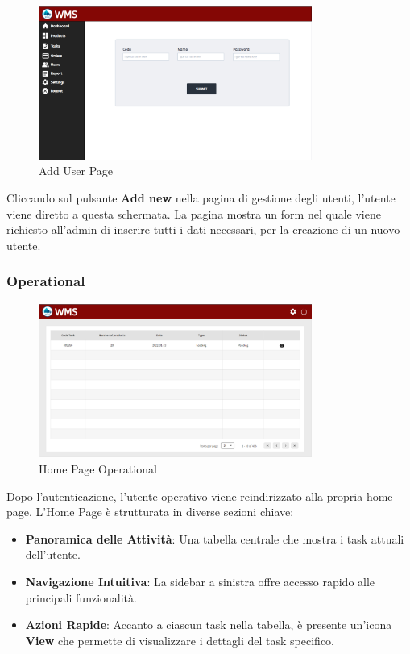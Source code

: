 \begin{figure}[H]
    \centering
    \includegraphics[width=0.8\textwidth]{document/sections/img/AddUser.png}
    \caption{Add User Page}
    \label{fig:addUserPage}
\end{figure}
Cliccando sul pulsante \textbf{Add new} nella pagina di gestione degli utenti,
l'utente viene diretto a questa schermata.
La pagina mostra un form nel quale viene richiesto all'admin di inserire tutti i dati necessari,
per la creazione di un nuovo utente.\\
\subsubsection{Operational}
\begin{figure}[H]
    \centering
    \includegraphics[width=0.8\textwidth]{document/sections/img/Dashboard.png}
    \caption{Home Page Operational}
    \label{fig:homePageOperational}
\end{figure}
Dopo l'autenticazione, l'utente operativo viene reindirizzato alla propria home page.
L'Home Page è strutturata in diverse sezioni chiave:
\begin{itemize}
    \item \textbf{Panoramica delle Attività}: Una tabella centrale che mostra i task attuali dell'utente.
    \item \textbf{Navigazione Intuitiva}: La sidebar a sinistra offre accesso rapido alle principali funzionalità.
    \item \textbf{Azioni Rapide}: Accanto a ciascun task nella tabella, è presente un'icona \textbf{View} che permette di visualizzare i dettagli del task specifico.
\end{itemize}


